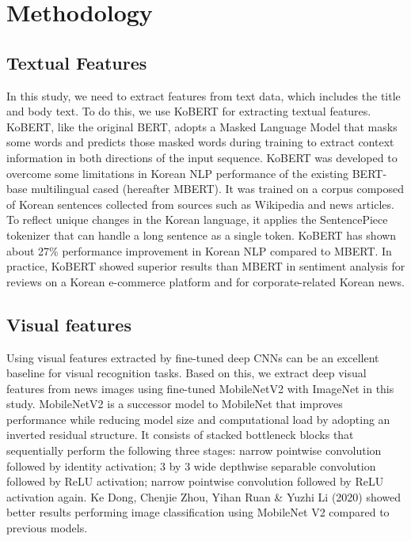 \documentclass{article}
\begin{document}
\section{Methodology}
\subsection{Textual Features}
In this study, we need to extract features from text data, which includes the title and body text. To do this, we use KoBERT for extracting textual features.
KoBERT, like the original BERT\cite{devlin2018bert}, adopts a Masked Language Model that masks some words and predicts those masked words during training to extract context information in both directions of the input sequence.
KoBERT was developed to overcome some limitations in Korean NLP performance of the existing BERT-base multilingual cased (hereafter MBERT). It was trained on a corpus composed of Korean sentences collected from sources such as Wikipedia and news articles.
To reflect unique changes in the Korean language, it applies the SentencePiece tokenizer that can handle a long sentence as a single token.
KoBERT has shown about 27\% performance improvement in Korean NLP compared to MBERT.
In practice, KoBERT showed superior results than MBERT in sentiment analysis for reviews on a Korean e-commerce platform and for corporate-related Korean news.




\subsection{Visual features}
Using visual features extracted by fine-tuned deep CNNs can be an excellent baseline for visual recognition tasks\cite{sharif2014cnn}. Based on this, we extract deep visual features from news images using fine-tuned MobileNetV2 with ImageNet in this study. MobileNetV2 is a successor model to MobileNet that improves performance while reducing model size and computational load by adopting an inverted residual structure. It consists of stacked bottleneck blocks that sequentially perform the following three stages: narrow pointwise convolution followed by identity activation; 3 by 3 wide depthwise separable convolution followed by ReLU activation; narrow pointwise convolution followed by ReLU activation again. Ke Dong, Chenjie Zhou, Yihan Ruan \& Yuzhi Li (2020) showed better results performing image classification using MobileNet V2 compared to previous models\cite{dong2020mobilenetv2}.
\end{document}
